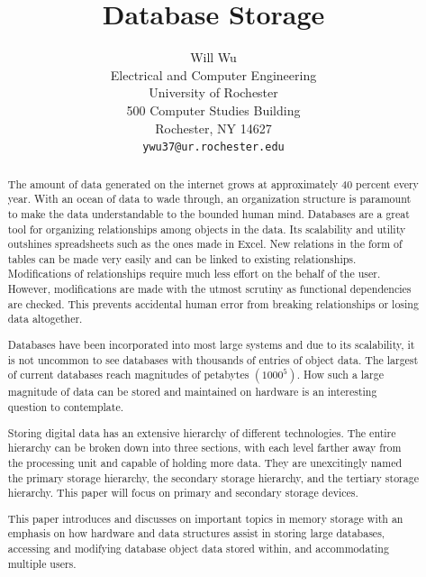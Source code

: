 \documentclass[letterpaper, 10 pt, conference]{ieeeconf}
\title{Database Storage}
\author{ \parbox{3 in}{\centering Will Wu\\
        Electrical and Computer Engineering\\
        University of Rochester\\
        500 Computer Studies Building \\
        Rochester, NY 14627\\
        {\tt\small ywu37@ur.rochester.edu}}
}
\begin{document}
\maketitle
\thispagestyle{empty}
\pagestyle{empty}


\begin{abstract}
The amount of data generated on the internet grows at approximately 40 percent every year. \cite{13}  With an ocean of data to wade through, an organization structure is paramount to make the data understandable to the bounded human mind.  Databases are a great tool for organizing relationships among objects in the data.  Its scalability and utility outshines spreadsheets such as the ones made in Excel.  New relations in the form of tables can be made very easily and can be linked to existing relationships.  Modifications of relationships require much less effort on the behalf of the user.  However, modifications are made with the utmost scrutiny as functional dependencies are checked.  This prevents accidental human error from breaking relationships or losing data altogether. 

Databases have been incorporated into most large systems and due to its scalability, it is not uncommon to see databases with thousands of entries of object data.  The largest of current databases reach magnitudes of petabytes $(1000^5)$.  How such a large magnitude of data can be stored and maintained on hardware is an interesting question to contemplate.

Storing digital data has an extensive hierarchy of different technologies.  The entire hierarchy can be broken down into three sections, with each level farther away from the processing unit and capable of holding more data.  They are unexcitingly named the primary storage hierarchy, the secondary storage hierarchy, and the tertiary storage hierarchy.  This paper will focus on primary and secondary storage devices.  

This paper introduces and discusses on important topics in memory storage with an emphasis on how hardware and data structures assist in storing large databases, accessing and modifying database object data stored within, and accommodating multiple users. 

\end{abstract}


\end{document}
